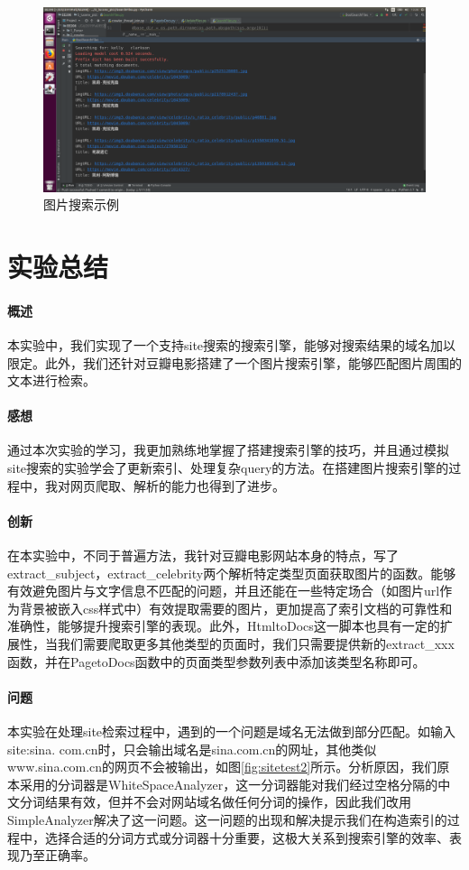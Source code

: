 \documentclass{article}
\begin{document}
\begin{figure}[htbp]
\centering
\includegraphics[width=14.5cm]{img/search3.png}
\caption{图片搜索示例}
\label{fig:search2pict}
\end{figure}

\section{实验总结}
\paragraph{概述}
本实验中，我们实现了一个支持site搜索的搜索引擎，能够对搜索结果的域名加以限定。此外，我们还针对豆瓣电影搭建了一个图片搜索引擎，能够匹配图片周围的文本进行检索。

\paragraph{感想}
通过本次实验的学习，我更加熟练地掌握了搭建搜索引擎的技巧，并且通过模拟site搜索的实验学会了更新索引、处理复杂query的方法。在搭建图片搜索引擎的过程中，我对网页爬取、解析的能力也得到了进步。

\paragraph{创新}
在本实验中，不同于普遍方法，我针对豆瓣电影网站本身的特点，写了extract\_subject，extract\_celebrity两个解析特定类型页面获取图片的函数。能够有效避免图片与文字信息不匹配的问题，并且还能在一些特定场合（如图片url作为背景被嵌入css样式中）有效提取需要的图片，更加提高了索引文档的可靠性和准确性，能够提升搜索引擎的表现。此外，HtmltoDocs这一脚本也具有一定的扩展性，当我们需要爬取更多其他类型的页面时，我们只需要提供新的extract\_xxx函数，并在PagetoDocs函数中的页面类型参数列表中添加该类型名称即可。

\paragraph{问题}
本实验在处理site检索过程中，遇到的一个问题是域名无法做到部分匹配。如输入site:sina. com.cn时，只会输出域名是sina.com.cn的网址，其他类似www.sina.com.cn的网页不会被输出，如图\ref{fig:sitetest2}所示。分析原因，我们原本采用的分词器是WhiteSpaceAnalyzer，这一分词器能对我们经过空格分隔的中文分词结果有效，但并不会对网站域名做任何分词的操作，因此我们改用SimpleAnalyzer解决了这一问题。这一问题的出现和解决提示我们在构造索引的过程中，选择合适的分词方式或分词器十分重要，这极大关系到搜索引擎的效率、表现乃至正确率。
\end{document}
